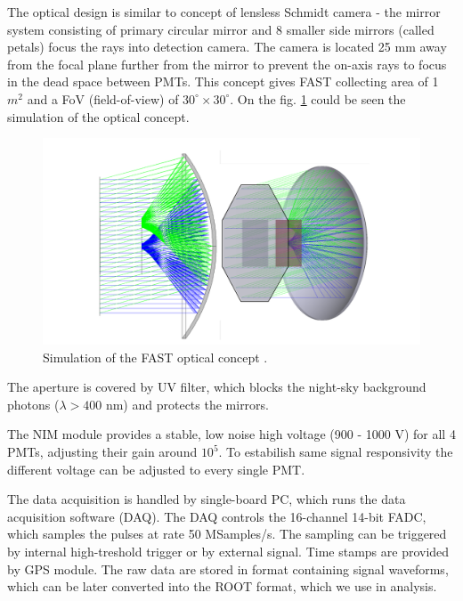 \par
The optical design is similar to concept of lensless Schmidt camera - the mirror system consisting of primary circular mirror and 8 smaller side mirrors (called petals) focus the rays into detection camera. The camera is located 25 mm away from the focal plane further from the mirror to prevent the on-axis rays to focus in the dead space between PMTs. This concept gives FAST collecting area of 1 $m^2$ and a FoV (field-of-view) of $30^{\circ} \times 30^{\circ}$. On the fig. \ref{FASTConc} could be seen the simulation of the optical concept.



\begin{figure}[H]
 \centering
 \includegraphics[scale = 0.2]{./pictures/FASTfocusing}
 \caption{Simulation of the FAST optical concept \cite{Mandat_2017}.}
 \label{FASTConc}
 
\end{figure}


\par
The aperture is covered by UV filter, which blocks the night-sky background photons ($\lambda > 400$ nm) and protects the mirrors.


\par
The NIM module provides a stable, low noise high voltage (900 - 1000 V) for all 4 PMTs, adjusting their gain around $10^5$. To estabilish same signal responsivity the different voltage can be adjusted to every single PMT.
\par
The data acquisition is handled by single-board PC, which runs the data acquisition software (DAQ). The DAQ controls the 16-channel 14-bit FADC, which samples the pulses at rate 50 MSamples/s. The sampling can be triggered by internal high-treshold trigger or by external signal. Time stamps are provided by GPS module. The raw data are stored in format containing signal waveforms, which can be later converted into the ROOT format, which we use in analysis.
